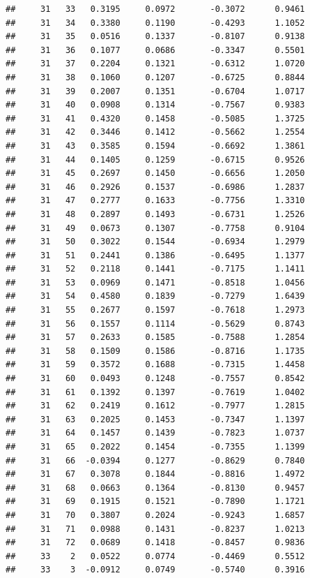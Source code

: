 \documentclass[
]{article}
\begin{document}
\begin{verbatim}
##     31   33   0.3195     0.0972       -0.3072      0.9461 
##     31   34   0.3380     0.1190       -0.4293      1.1052 
##     31   35   0.0516     0.1337       -0.8107      0.9138 
##     31   36   0.1077     0.0686       -0.3347      0.5501 
##     31   37   0.2204     0.1321       -0.6312      1.0720 
##     31   38   0.1060     0.1207       -0.6725      0.8844 
##     31   39   0.2007     0.1351       -0.6704      1.0717 
##     31   40   0.0908     0.1314       -0.7567      0.9383 
##     31   41   0.4320     0.1458       -0.5085      1.3725 
##     31   42   0.3446     0.1412       -0.5662      1.2554 
##     31   43   0.3585     0.1594       -0.6692      1.3861 
##     31   44   0.1405     0.1259       -0.6715      0.9526 
##     31   45   0.2697     0.1450       -0.6656      1.2050 
##     31   46   0.2926     0.1537       -0.6986      1.2837 
##     31   47   0.2777     0.1633       -0.7756      1.3310 
##     31   48   0.2897     0.1493       -0.6731      1.2526 
##     31   49   0.0673     0.1307       -0.7758      0.9104 
##     31   50   0.3022     0.1544       -0.6934      1.2979 
##     31   51   0.2441     0.1386       -0.6495      1.1377 
##     31   52   0.2118     0.1441       -0.7175      1.1411 
##     31   53   0.0969     0.1471       -0.8518      1.0456 
##     31   54   0.4580     0.1839       -0.7279      1.6439 
##     31   55   0.2677     0.1597       -0.7618      1.2973 
##     31   56   0.1557     0.1114       -0.5629      0.8743 
##     31   57   0.2633     0.1585       -0.7588      1.2854 
##     31   58   0.1509     0.1586       -0.8716      1.1735 
##     31   59   0.3572     0.1688       -0.7315      1.4458 
##     31   60   0.0493     0.1248       -0.7557      0.8542 
##     31   61   0.1392     0.1397       -0.7619      1.0402 
##     31   62   0.2419     0.1612       -0.7977      1.2815 
##     31   63   0.2025     0.1453       -0.7347      1.1397 
##     31   64   0.1457     0.1439       -0.7823      1.0737 
##     31   65   0.2022     0.1454       -0.7355      1.1399 
##     31   66  -0.0394     0.1277       -0.8629      0.7840 
##     31   67   0.3078     0.1844       -0.8816      1.4972 
##     31   68   0.0663     0.1364       -0.8130      0.9457 
##     31   69   0.1915     0.1521       -0.7890      1.1721 
##     31   70   0.3807     0.2024       -0.9243      1.6857 
##     31   71   0.0988     0.1431       -0.8237      1.0213 
##     31   72   0.0689     0.1418       -0.8457      0.9836 
##     33    2   0.0522     0.0774       -0.4469      0.5512 
##     33    3  -0.0912     0.0749       -0.5740      0.3916 

\end{verbatim}
\end{document}
